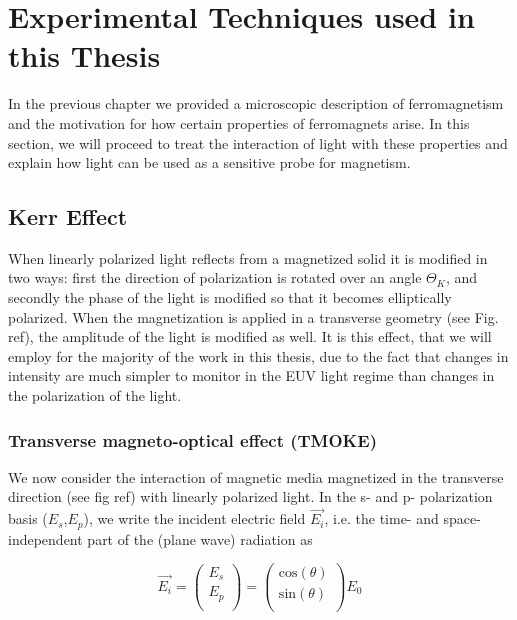 \chapter{Experimental Techniques used in this Thesis}

In the previous chapter we provided a microscopic description of ferromagnetism and the motivation for how certain properties of ferromagnets arise. In this section, we will proceed to treat the interaction of light with these properties and explain how light can be used as a sensitive probe for magnetism. 

\section{Kerr Effect}

When linearly polarized light reflects from a magnetized solid it is modified in two ways: first the direction of polarization is rotated over an angle $\Theta_K$, and secondly the phase of the light is modified so that it becomes elliptically polarized. When the magnetization is applied in a transverse geometry (see Fig. ref), the amplitude of the light is modified as well. It is this effect, that we will employ for the majority of the work in this thesis, due to the fact that changes in intensity are much simpler to monitor in the EUV light regime than changes in the polarization of the light.


\subsection{Transverse magneto-optical effect (TMOKE)}
 
We now consider the interaction of magnetic media magnetized in the transverse direction (see fig ref) with linearly polarized light. In the s- and p- polarization basis ($E_s$,$E_p$), we write the incident electric field $\vec{E_i}$, i.e. the time- and space- independent part of the (plane wave) radiation as

\begin{equation}
\overrightarrow{E_i} = \left({\begin{array}{c}
	E_s \\
	E_p \\
	\end{array} } \right) 
= \left({\begin{array}{c}
	\text{cos}(\theta) \\
	\text{sin}(\theta) \\
	\end{array} } \right) E_0
\end{equation}

